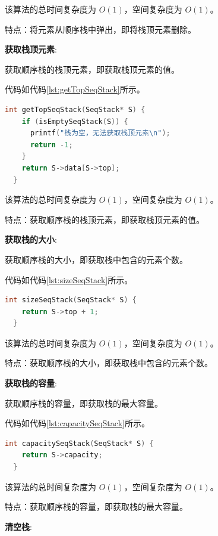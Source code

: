 \documentclass[lang=cn,newtx,10pt,scheme=chinese]{../elegantbook}
\begin{document}
该算法的总时间复杂度为 $O(1)$，空间复杂度为 $O(1)$。

特点：将元素从顺序栈中弹出，即将栈顶元素删除。

\textbf{获取栈顶元素}:

获取顺序栈的栈顶元素，即获取栈顶元素的值。

代码如代码\ref{lst:getTopSeqStack}所示。

\begin{lstlisting}[language=C++, caption={获取顺序栈的栈顶元素示例代码}, label={lst:getTopSeqStack}]
  int getTopSeqStack(SeqStack* S) {
    if (isEmptySeqStack(S)) {
      printf("栈为空，无法获取栈顶元素\n");
      return -1;
    }
    return S->data[S->top];
  }

\end{lstlisting}

该算法的总时间复杂度为 $O(1)$，空间复杂度为 $O(1)$。

特点：获取顺序栈的栈顶元素，即获取栈顶元素的值。

\textbf{获取栈的大小}:

获取顺序栈的大小，即获取栈中包含的元素个数。

代码如代码\ref{lst:sizeSeqStack}所示。

\begin{lstlisting}[language=C++, caption={获取顺序栈的大小示例代码}, label={lst:sizeSeqStack}]
  int sizeSeqStack(SeqStack* S) {
    return S->top + 1;
  }

\end{lstlisting}

该算法的总时间复杂度为 $O(1)$，空间复杂度为 $O(1)$。

特点：获取顺序栈的大小，即获取栈中包含的元素个数。

\textbf{获取栈的容量}:

获取顺序栈的容量，即获取栈的最大容量。

代码如代码\ref{lst:capacitySeqStack}所示。

\begin{lstlisting}[language=C++, caption={获取顺序栈的容量示例代码}, label={lst:capacitySeqStack}]
  int capacitySeqStack(SeqStack* S) {
    return S->capacity;
  }

\end{lstlisting}

该算法的总时间复杂度为 $O(1)$，空间复杂度为 $O(1)$。

特点：获取顺序栈的容量，即获取栈的最大容量。

\textbf{清空栈}:
\end{document}

